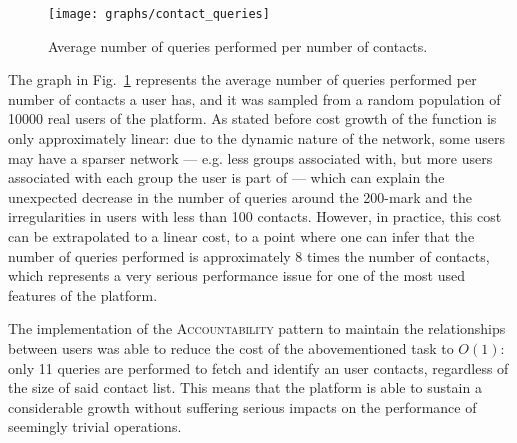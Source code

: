 \begin{figure}[H]
  \centering
  \texttt{[image: graphs/contact\_queries]}
  \caption{Average number of queries performed per number of contacts.}
  \label{fig:contact_queries}
\end{figure}

The graph in Fig.~\ref{fig:contact_queries} represents the average number of queries performed per number of contacts a user has, and it was sampled from a random population of 10000 real users of the platform. As stated before cost growth of the function is only approximately linear: due to the dynamic nature of the network, some users may have a sparser network --- e.g. less groups associated with, but more users associated with each group the user is part of --- which can explain the unexpected decrease in the number of queries around the 200-mark and the irregularities in users with less than 100 contacts. However, in practice, this cost can be extrapolated to a linear cost, to a point where one can infer that the number of queries performed is approximately 8 times the number of contacts, which represents a very serious performance issue for one of the most used features of the platform.


The implementation of the \textsc{Accountability} pattern to maintain the relationships between users was able to reduce the cost of the abovementioned task to $O(1)$: only 11 queries are performed to fetch and identify an user contacts, regardless of the size of said contact list. This means that the platform is able to sustain a considerable growth without suffering serious impacts on the performance of seemingly trivial operations.

